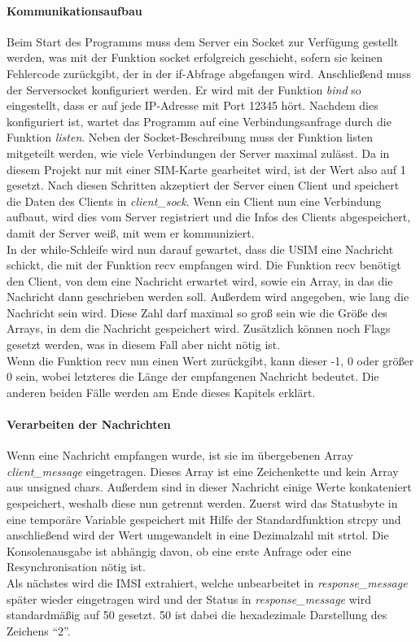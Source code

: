 		\paragraph{Kommunikationsaufbau}
		Beim Start des Programms muss dem Server ein Socket zur Verfügung gestellt werden, was mit der Funktion
		socket erfolgreich geschieht, sofern sie keinen Fehlercode zurückgibt, der in der if-Abfrage abgefangen wird.
		Anschließend muss	der Serversocket konfiguriert werden. Er wird mit der Funktion \emph{bind} so eingestellt, dass er
		auf jede IP-Adresse mit Port 12345 hört. Nachdem dies konfiguriert ist, wartet das Programm auf eine Verbindungsanfrage
		durch die Funktion \emph{listen}. Neben der Socket-Beschreibung muss der Funktion listen mitgeteilt werden, wie viele Verbindungen
		der Server maximal zulässt. Da in diesem Projekt nur mit einer SIM-Karte gearbeitet wird, ist der Wert also auf 1 gesetzt.
		Nach diesen Schritten akzeptiert der Server einen Client und speichert die Daten des Clients in \emph{client\_sock}.
		Wenn ein Client nun eine Verbindung aufbaut, wird dies vom Server registriert und die Infos des Clients abgespeichert,
		damit der Server weiß, mit wem er kommuniziert. \\
		In der while-Schleife wird nun darauf gewartet, dass die USIM eine Nachricht schickt, die mit der Funktion recv empfangen
		wird. Die Funktion recv benötigt den Client, von dem eine Nachricht erwartet wird, sowie ein Array, in das die Nachricht dann
		geschrieben werden soll. Außerdem wird angegeben, wie lang die Nachricht sein wird. Diese Zahl darf maximal
		so groß sein wie die Größe des Arrays, in dem die Nachricht gespeichert wird. Zusätzlich können noch Flags
		gesetzt werden, was in diesem Fall aber nicht nötig ist. \\
		Wenn die Funktion recv nun einen Wert zurückgibt, kann dieser -1, 0 oder größer 0 sein, wobei letzteres die
		Länge der empfangenen Nachricht bedeutet. Die anderen beiden Fälle werden am Ende dieses Kapitels erklärt.
		
		\paragraph{Verarbeiten der Nachrichten}
		Wenn eine Nachricht empfangen wurde, ist sie im über\-gebenen Array \emph{client\_message} eingetragen. Dieses
		Array ist eine Zeichenkette und kein Array aus unsigned chars. Außerdem sind in dieser Nachricht einige
		Werte konkateniert gespeichert, weshalb diese nun getrennt werden. Zuerst wird das Statusbyte in eine
		temporäre Variable gespeichert mit Hilfe der Standardfunktion strcpy und anschließend wird der Wert
		umgewandelt in eine Dezimalzahl mit strtol. Die Konsolenausgabe ist abhängig davon, ob eine erste Anfrage
		oder eine Resynchronisation nötig ist. \\
		Als nächstes wird die IMSI extrahiert, welche unbearbeitet in \emph{response\_message} später wieder
		eingetragen wird und der Status in \emph{response\_message} wird standardmäßig auf 50 gesetzt. 50 ist
		dabei die hexadezimale Darstellung des Zeichens ``2''.
		
